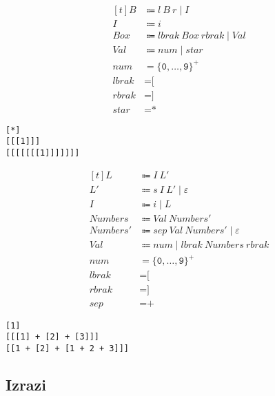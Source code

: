 \documentclass{report}
\newcommand{\Null}{\varepsilon}
\newcommand{\Char}[1]{\texttt{#1}}
\newcommand{\Spc}{\ }
\newcommand{\Union}{\mathrel{|}}
\newcommand{\KleenePlus}[1]{#1^+}
\newcommand{\Arrow}{\Coloneq}
\newcommand{\NT}[1]{{#1}}
\newcommand{\T}[1]{{#1}}
\begin{document}
\begin{equation*}
  \begin{aligned}[t]
    \NT{B} &\Arrow \T{l} \Spc \NT{B} \Spc \T{r} \Union \NT{I}\\[1em]
    \NT{I} &\Arrow \T{i}\\
    \NT{Box} &\Arrow \T{lbrak} \Spc \NT{Box} \Spc \T{rbrak} \Union \NT{Val}\\
    \NT{Val} &\Arrow \T{num} \Union \T{star}\\[1em]
    \T{num} &= \KleenePlus{\{\Char{0}, \dots, \Char{9}\}}\\
    \T{lbrak} &= \Char{[}\\
    \T{rbrak} &= \Char{]}\\
    \T{star} &= \Char{*}
  \end{aligned}
\end{equation*}
\begin{lstlisting}
[*]
[[[1]]]
[[[[[[[1]]]]]]]
\end{lstlisting}

\begin{equation*}
  \begin{aligned}[t]
    \NT{L} &\Arrow \NT{I} \Spc \NT{L'}\\
    \NT{L'} &\Arrow \T{s} \Spc \NT{I} \Spc \NT{L'} \Union \Null\\
    \NT{I} &\Arrow \T{i} \Union \NT{L}\\[1em]
    \NT{Numbers} &\Arrow \T{Val} \Spc \NT{Numbers'}\\
    \NT{Numbers'} &\Arrow \T{sep} \Spc \T{Val} \Spc \NT{Numbers'} \Union \Null\\
    \NT{Val} &\Arrow \T{num} \Union \T{lbrak} \Spc \NT{Numbers} \Spc \T{rbrak}\\[1em]
    \T{num} &= \KleenePlus{\{\Char{0}, \dots, \Char{9}\}}\\
    \T{lbrak} &= \Char{[}\\
    \T{rbrak} &= \Char{]}\\
    \T{sep} &= \Char{+}
  \end{aligned}
\end{equation*}
\begin{lstlisting}
[1]
[[[1] + [2] + [3]]]
[[1 + [2] + [1 + 2 + 3]]]
\end{lstlisting}

\subsection*{Izrazi}
\end{document}
